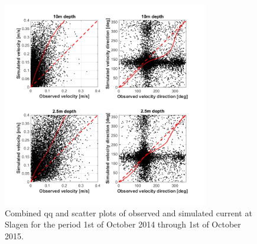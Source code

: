\begin{figure}[htb]
	\centerline{
		\includegraphics*[trim=0cm 0cm 0cm 0cm,clip=true,width=0.8\textwidth]{Figurer/Slagen_QQ} }
	\caption{\small Combined qq and scatter plots of observed and simulated current at Slagen for the period 1st of October 2014 through 1st of October 2015.}
	\label{fig:Slagen_QQ}
\end{figure}

